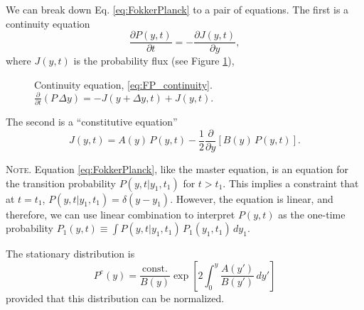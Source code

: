\documentclass{book}
\numberwithin{equation}{section}
\theoremstyle{plain}
\theoremstyle{definition}
\theoremstyle{remark}
\theoremstyle{BoldStyle}
\numberwithin{exercise}{section}
\newcommand{\note}[1]{{\color{DarkGreen}\footnotesize \textsc{Note.} #1}}
\begin{document}
We can break down Eq. \eqref{eq:FokkerPlanck}
to a pair of equations.
%
The first is a continuity equation
%
\begin{equation}
\frac{ \partial P(y, t) } { \partial t }
=
-\frac{ \partial J(y, t) } { \partial y },
\label{eq:FP_continuity}
\end{equation}
%
where $J(y, t)$ is the probability flux (see Figure \ref{fig:FP_continuity}),
\begin{figure}[h]
  \centering
  \label{fig:FP_continuity}
  \caption{
    Continuity equation, \eqref{eq:FP_continuity}.
    $\frac{ \partial } { \partial t } \left( P \, \Delta y \right) = -J(y+ \Delta y, t) + J(y, t).$
  }
\end{figure}
%
The second is a ``constitutive equation''
%
\begin{equation}
J(y, t)
=
A(y) \, P(y, t)
-
\frac{1}{2}
\frac{ \partial }{ \partial y }
\left[
  B(y) \, P(y, t)
\right].
\label{eq:FP_constitutive}
\end{equation}
%

\note{Equation \eqref{eq:FokkerPlanck},
like the master equation,
is an equation for the transition probability
$P(y, t|y_1, t_1)$ for $t > t_1$.
%
This implies a constraint that at $t = t_1$,
$P(y, t|y_1, t_1) = \delta(y - y_1)$.
%
However, the equation is linear,
and therefore, we can use linear combination
to interpret $P(y, t)$
as the one-time probability
$P_1(y, t) \equiv \int P(y, t|y_1, t_1) \, P_1(y_1, t_1) \, dy_1$.
}

The stationary distribution is
%
\begin{equation}
  P^e(y)
  =
  \frac{ \mathrm{const.} } { B(y) }
  \exp\left[
    2 \int_0^y
      \frac{ A(y') } { B(y') } \, dy'
  \right]
  \label{eq:FP_stationary}
\end{equation}
%
provided that this distribution can be normalized.
\end{document}
